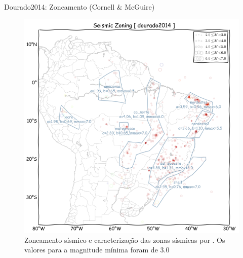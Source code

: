 \documentclass[ucs,8pt]{beamer}
\begin{document}
\begin{frame}{Dourado2014: Zoneamento (Cornell \& McGuire)}
\begin{figure}[H]
  \centering
  \includegraphics[height=.93\textheight]{a_dourado} 
  \caption{Zoneamento sísmico e caracterização das zonas sísmicas por \citep{dourado_2014}.
  Os valores para a magnitude mínima foram de 3.0}
  \label{fig:a_dourado} 
\end{figure}
\end{frame}
\end{document}
